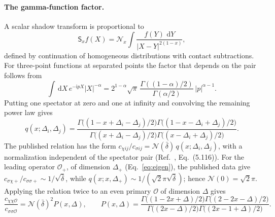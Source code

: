 \documentclass[11pt,a4paper]{article}
\numberwithin{equation}{section}
\newcommand{\dd}{\,\mathrm d}
\newcommand{\db}{\bar\delta}
\begin{document}
\paragraph{The gamma-function factor.} A scalar shadow transform is proportional to
\begin{equation}
 \mathsf S_xf(X)=\mathcal N_x\int\frac{f(Y)\,\dd Y}{|X-Y|^{2(1-x)}},
\end{equation}
defined by continuation of homogeneous distributions with contact subtractions. For three-point functions at separated
points the factor that depends on the pair follows from
\begin{equation}
 \int\dd X\,e^{-\mathrm ipX}|X|^{-\alpha}=2^{1-\alpha}\sqrt\pi\,\frac{\Gamma((1-\alpha)/2)}{\Gamma(\alpha/2)}\,|p|^{\alpha-1}.
\end{equation}
Putting one spectator at zero and one at infinity and convolving the remaining power law gives
\begin{equation}
 q(x;\Delta_i,\Delta_j)=\frac{\Gamma\bigl((1-x+\Delta_i-\Delta_j)/2\bigr)\Gamma\bigl((1-x-\Delta_i+\Delta_j)/2\bigr)}
 {\Gamma\bigl((x+\Delta_i-\Delta_j)/2\bigr)\Gamma\bigl((x-\Delta_i+\Delta_j)/2\bigr)}.
\end{equation}
The published relation has the form $c_{\chi ij}/c_{\sigma ij}=\mathcal N(\db)\,q(x;\Delta_i,\Delta_j)$, with a
normalization independent of the spectator pair (Ref.~\cite{Benedetti:2025nzp}, Eq.~(5.116)). For the leading
operator $\mathcal O_+$, of dimension $\Delta_+$ (Eq.~\eqref{eq:eigen}), the published data give
$c_{\sigma\chi+}/c_{\sigma\sigma+}\sim1/\sqrt{\db}$, while $q(x;x,\Delta_+)\sim1/(\sqrt2\pi\sqrt{\db})$; hence
$\mathcal N(0)=\sqrt2\pi$. Applying the relation twice to an even primary $\mathcal O$ of dimension $\Delta$ gives
\begin{equation}
 \frac{c_{\chi\chi\mathcal O}}{c_{\sigma\sigma\mathcal O}}=\mathcal N(\db)^2P(x,\Delta),\qquad
 P(x,\Delta)=\frac{\Gamma\bigl((1-2x+\Delta)/2\bigr)\Gamma\bigl((2-2x-\Delta)/2\bigr)}
 {\Gamma\bigl((2x-\Delta)/2\bigr)\Gamma\bigl((2x-1+\Delta)/2\bigr)}.
 \label{eq:dualC:shadowP}
\end{equation}
\end{document}
